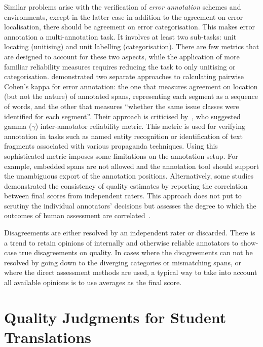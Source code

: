 Similar problems arise with the verification of \textit{error annotation} schemes and environments, except in the latter case in addition to the agreement on error localisation, there should be agreement on error categorisation. This makes error annotation a multi-annotation task. It involves at least two sub-tasks: unit locating (unitising) and unit labelling (categorisation). There are few metrics that are designed to account for these two aspects, while the application of more familiar reliability measures requires reducing the task to only unitising or categorisation.
\citet[p.33]{Lommel2014} demonstrated two separate approaches to calculating pairwise Cohen's kappa for error annotation: the one that measures agreement on location (but not the nature) of annotated spans, representing each segment as a sequence of words, and the other that measures ``whether the same issue classes were identified for each segment''.
Their approach is criticised by~\citet[p. 444-445]{Mathet2015}, who suggested gamma ($\gamma$) inter-annotator reliability metric. This metric is used for verifying annotation in tasks such as named entity recognition or identification of text fragments associated with various propaganda techniques. Using this sophisticated metric imposes some limitations on the annotation setup. For example, embedded spans are not allowed and the annotation tool should support the unambiguous export of the annotation positions. Alternatively, some studies demonstrated the consistency of quality estimates by reporting the correlation between final scores from independent raters. This approach does not put to scrutiny the individual annotators' decisions but assesses the degree to which the outcomes of human assessment are correlated~\cite{Eyckmans2009}.

Disagreements are either resolved by an independent rater or discarded. There is a trend to retain opinions of internally and otherwise reliable annotators to show-case true disagreements on quality. In cases where the disagreements can not be resolved by going down to the diverging categories or mismatching spans, or where the direct assessment methods are used, a typical way to take into account all available opinions is to use averages as the final score.   

\section{\label{sec:mygold}Quality Judgments for Student Translations}

